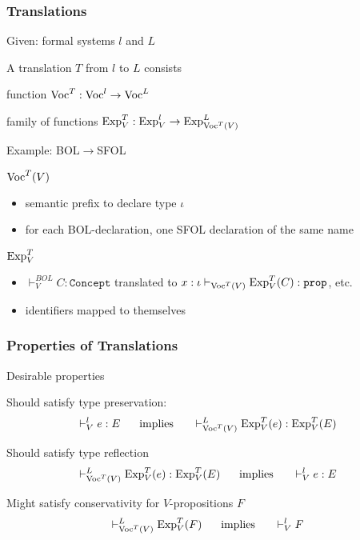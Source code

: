 \begin{frame}\frametitle{Translations}
Given: formal systems $l$ and $L$
\begin{blockitems}{A translation $T$ from $l$ to $L$ consists}
\item function $\mathrm{Voc}^T:\mathrm{Voc}^l\to\mathrm{Voc}^L$
\item family of functions $\mathrm{Exp}^T_V:\mathrm{Exp}^l_V\to\mathrm{Exp}^L_{\mathrm{Voc}^T(V)}$
\end{blockitems}

\begin{blockitems}{Example: BOL$\to$SFOL}
\item $\mathrm{Voc}^T(V)$
 \begin{itemize}
  \item semantic prefix to declare type $\iota$
  \item for each BOL-declaration, one SFOL declaration of the same name
 \end{itemize}
\item $\mathrm{Exp}^T_V$
 \begin{itemize}
  \item $\vdash^{BOL}_V C:\mathtt{Concept}$ translated to $x:\iota\vdash_{\Voc^T(V)}\Exp^T_V(C):\prop$, etc.
  \item identifiers mapped to themselves
 \end{itemize}
\end{blockitems}
\end{frame}

\begin{frame}\frametitle{Properties of Translations}
\begin{blockitems}{Desirable properties}
\item Should satisfy type preservation:
\[\vdash^l_V e:E \hspace*{.5cm}\;\mathrm{implies}\;\hspace*{.5cm} \vdash^L_{\mathrm{Voc}^T(V)} \mathrm{Exp}^T_V(e):\mathrm{Exp}^T_V(E)\]
\item Should satisfy type reflection
\[\vdash^L_{\mathrm{Voc}^T(V)} \mathrm{Exp}^T_V(e):\mathrm{Exp}^T_V(E) \hspace*{.5cm}\;\mathrm{implies}\;\hspace*{.5cm} \vdash^l_V e:E\]
\item Might satisfy conservativity for $V$-propositions $F$
\[\vdash^L_{\mathrm{Voc}^T(V)} \mathrm{Exp}^T_V(F) \hspace*{.5cm}\;\mathrm{implies}\;\hspace*{.5cm} \vdash^l_V F\]
\end{blockitems}
\end{frame}

